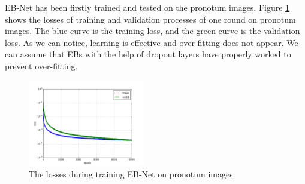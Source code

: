 \documentclass[review]{elsarticle}
\begin{document}


EB-Net has been firstly trained and tested on the pronotum images. Figure \ref{figdlosses} shows the losses of training and validation processes of one round on pronotum images. The blue curve is the training loss, and the green curve is the validation loss. As we can notice, learning is effective and over-fitting does not appear. We can assume that EBs with the help of dropout layers have properly worked to prevent over-fitting.

\begin{figure}[h!]
    \centering
	\includegraphics[width=0.45\textwidth]{./images/loss_v16}
    \caption{The losses during training EB-Net on pronotum images.}
    \label{figdlosses}
\end{figure}
\end{document}
